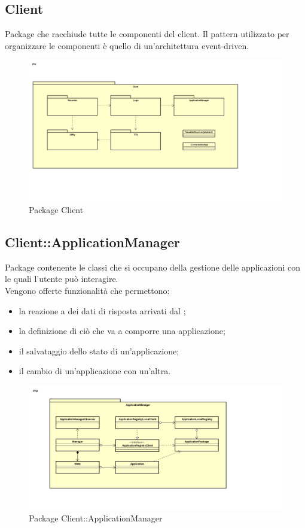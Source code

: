 \subsection{Client}
Package che racchiude tutte le componenti del client. Il pattern utilizzato per organizzare le componenti è quello di un'architettura event-driven.
\begin{figure}[h] \centering \includegraphics[width=\textwidth,height=\textheight,keepaspectratio]{images/diagrams/client/Client/Client.png}
\caption{Package Client}
\end{figure}
\newpage


\subsection{Client::ApplicationManager}
Package contenente le classi che si occupano della gestione delle applicazioni con le quali l'utente può interagire.\\ Vengono offerte funzionalità che permettono: \begin{itemize} \item la reazione a dei dati di risposta arrivati dal ; \item la definizione di ciò che va a comporre una applicazione; \item il salvataggio dello stato di un'applicazione; \item il cambio di un'applicazione con un'altra. \end{itemize}
\begin{figure}[h] \centering \includegraphics[width=\textwidth,height=\textheight,keepaspectratio]{images/diagrams/client/Client/ApplicationManager.png}
\caption{Package Client::ApplicationManager}
\end{figure}
\newpage


